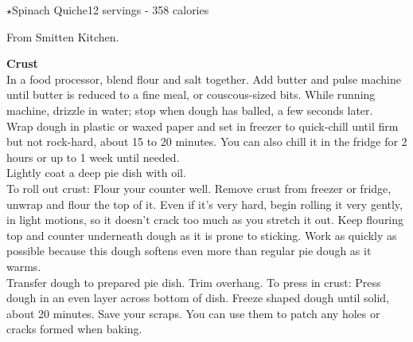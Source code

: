 \begin{recipe}{\texorpdfstring{$\star$}{str}Spinach Quiche}{12 servings - 358 calories}{}

    \freeform From Smitten Kitchen.


    \textbf{Crust}\\

    In a food processor, blend flour and salt together. Add butter and pulse machine until butter is reduced to a fine meal, or couscous-sized bits. While running machine, drizzle in water; stop when dough has balled, a few seconds later.\\

    Wrap dough in plastic or waxed paper and set in freezer to quick-chill until firm but not rock-hard, about 15 to 20 minutes. You can also chill it in the fridge for 2 hours or up to 1 week until needed.\\

    Lightly coat a deep pie dish with oil.\\

    To roll out crust: Flour your counter well. Remove crust from freezer or fridge, unwrap and flour the top of it. Even if it’s very hard, begin rolling it very gently, in light motions, so it doesn't crack too much as you stretch it out. Keep flouring top and counter underneath dough as it is prone to sticking. Work as quickly as possible because this dough softens even more than regular pie dough as it warms.\\

    Transfer dough to prepared pie dish. Trim overhang. To press in crust: Press dough in an even layer across bottom of dish. Freeze shaped dough until solid, about 20 minutes. Save your scraps. You can use them to patch any holes or cracks formed when baking.\\


\end{recipe}
